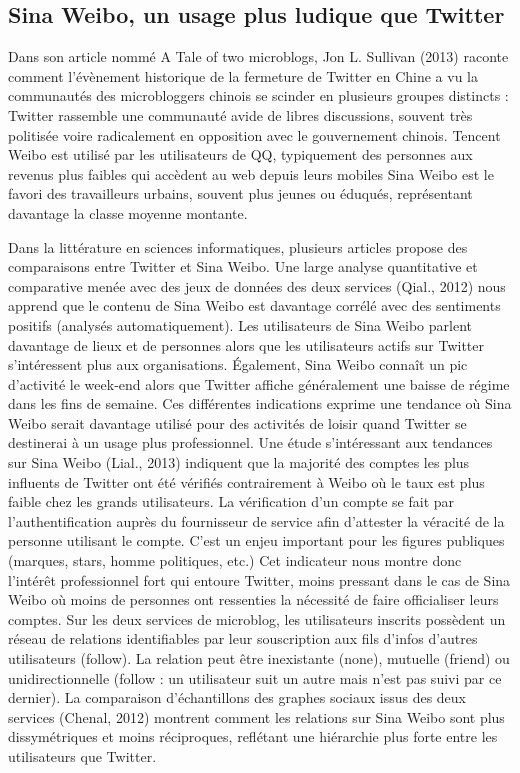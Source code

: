 \subsection[Sina Weibo, un usage plus ludique que Twitter ]{Sina Weibo, un usage plus ludique que Twitter }
Dans son article nommé A Tale of two microblogs, Jon L. Sullivan (2013) raconte comment l’évènement historique de la fermeture de Twitter en Chine a vu la communautés des microbloggers chinois se scinder en plusieurs groupes distincts : 
Twitter rassemble une communauté avide de libres discussions, souvent très politisée voire radicalement en opposition avec le gouvernement chinois.
Tencent Weibo est utilisé par les utilisateurs de QQ, typiquement des personnes aux revenus plus faibles qui accèdent au web depuis leurs mobiles
Sina Weibo est le favori des travailleurs urbains, souvent plus jeunes ou éduqués, représentant davantage la classe moyenne montante.

Dans la littérature en sciences informatiques, plusieurs articles propose des comparaisons entre Twitter et Sina Weibo. Une large analyse quantitative et comparative menée avec des jeux de données des deux services (Qial., 2012) nous apprend que le contenu de Sina Weibo est davantage corrélé avec des sentiments positifs (analysés automatiquement). Les utilisateurs de Sina Weibo parlent davantage de lieux et de personnes alors que les utilisateurs actifs sur Twitter s’intéressent plus aux organisations. Également, Sina Weibo connaît un pic d’activité le week-end alors que Twitter affiche généralement une baisse de régime dans les fins de semaine. Ces différentes indications exprime une tendance où Sina Weibo serait davantage utilisé pour des activités de loisir quand Twitter se destinerai à un usage plus professionnel. Une étude s’intéressant aux tendances sur Sina Weibo (Lial., 2013) indiquent que la majorité des comptes les plus influents de Twitter ont été vérifiés contrairement à Weibo où le taux est plus faible chez les grands utilisateurs. La vérification d’un compte se fait par l’authentification auprès du fournisseur de service afin d’attester la véracité de la personne utilisant le compte. C’est un enjeu important pour les figures publiques (marques, stars, homme politiques, etc.) Cet indicateur nous montre donc l’intérêt professionnel fort qui entoure Twitter, moins pressant dans le cas de Sina Weibo où moins de personnes ont ressenties la nécessité de faire officialiser leurs comptes. Sur les deux services de microblog, les utilisateurs inscrits possèdent un réseau de relations identifiables par leur souscription aux fils d’infos d’autres utilisateurs (follow). La relation peut être inexistante (none), mutuelle (friend) ou unidirectionnelle (follow : un utilisateur suit un autre mais n’est pas suivi par ce dernier). La comparaison d’échantillons des graphes sociaux issus des deux services (Chenal, 2012) montrent comment les relations sur Sina Weibo sont plus dissymétriques et moins réciproques, reflétant une hiérarchie plus forte entre les utilisateurs que Twitter. 

